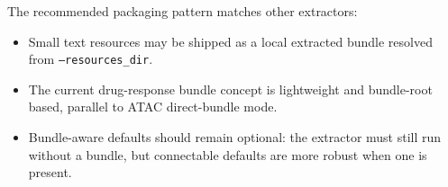 \documentclass[11pt]{article}
\begin{document}
The recommended packaging pattern matches other extractors:
\begin{itemize}
  \item Small text resources may be shipped as a local extracted bundle resolved from \texttt{--resources\_dir}.
  \item The current drug-response bundle concept is lightweight and bundle-root based, parallel to ATAC direct-bundle mode.
  \item Bundle-aware defaults should remain optional: the extractor must still run without a bundle, but connectable defaults are more robust when one is present.
\end{itemize}
\end{document}
